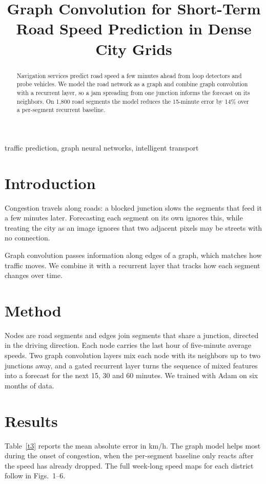 \documentclass[conference]{IEEEtran}
\begin{document}
\title{Graph Convolution for Short-Term Road Speed Prediction in Dense City Grids}
\author{}
\maketitle
\begin{abstract}
Navigation services predict road speed a few minutes ahead from loop detectors and probe vehicles. We model the road network as a graph and combine graph convolution with a recurrent layer, so a jam spreading from one junction informs the forecast on its neighbors. On 1,800 road segments the model reduces the 15-minute error by 14\% over a per-segment recurrent baseline.
\end{abstract}
\begin{IEEEkeywords}
traffic prediction, graph neural networks, intelligent transport
\end{IEEEkeywords}
\section{Introduction}
Congestion travels along roads: a blocked junction slows the segments that feed it a few minutes later. Forecasting
each segment on its own ignores this, while treating the city as an image ignores that two adjacent pixels may be
streets with no connection.

Graph convolution \cite{kipf} passes information along edges of a graph, which matches how traffic moves. We combine it
with a recurrent layer \cite{hochreiter} that tracks how each segment changes over time.

\section{Method}
Nodes are road segments and edges join segments that share a junction, directed in the driving direction. Each node
carries the last hour of five-minute average speeds. Two graph convolution layers mix each node with its neighbors up
to two junctions away, and a gated recurrent layer turns the sequence of mixed features into a forecast for the next
15, 30 and 60 minutes. We trained with Adam \cite{kingma} on six months of data.

\section{Results}
Table~\ref{t3} reports the mean absolute error in km/h. The graph model helps most during the onset of congestion,
when the per-segment baseline only reacts after the speed has already dropped. The full week-long speed maps for each
district follow in Figs.~1--6.
\end{document}
